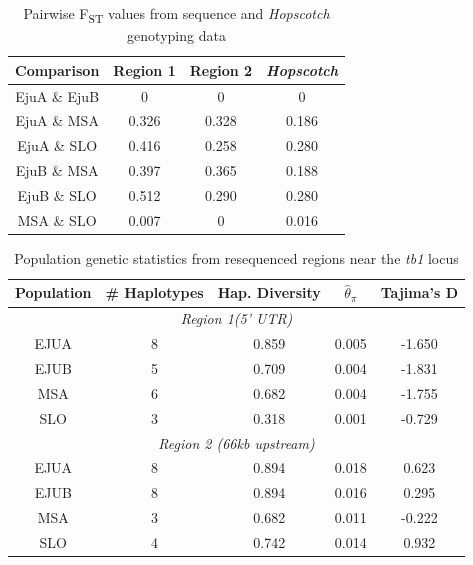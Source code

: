 \documentclass[11pt]{article} %
\begin{document}
\begin{linenumbers}
\begin{flushleft}
\clearpage
\begin{table}[htbp]
  \centering
  \caption{Pairwise F\textsubscript{ST} values from sequence and \emph{Hopscotch} genotyping data}%
    \begin{tabular}{cccc}\\\toprule%
    \textbf{Comparison} & \textbf{Region 1} & \textbf{Region 2} & \textbf{\emph{Hopscotch}} \\\midrule
    EjuA \& EjuB & 0     & 0     & 0 \\
    EjuA \& MSA & 0.326 & 0.328 & 0.186 \\
    EjuA \& SLO & 0.416 & 0.258 & 0.280 \\
    EjuB \& MSA & 0.397 & 0.365 & 0.188 \\
    EjuB \& SLO & 0.512  & 0.290 & 0.280 \\
    MSA \& SLO & 0.007  & 0 & 0.016 \\\bottomrule
    \end{tabular}
  \label{Table1Fst}%
\end{table}

\begin{table}[htbp]
  \centering
  \caption{Population genetic statistics from resequenced regions near the \emph{tb1} locus}
    \begin{tabular}{ccccc}\\\toprule
    \textbf{Population} & \# \textbf{Haplotypes} & \textbf{Hap. Diversity} & \textbf{$\hat\theta_\pi$}    & \textbf{Tajima's D} \\\midrule
    \multicolumn{5}{c}{\textit{Region 1(5' UTR)}} \\
    \multicolumn{1}{c}{EJUA} & 8     & 0.859 & 0.005 & -1.650 \\
    \multicolumn{1}{c}{EJUB} & 5     & 0.709 & 0.004 & -1.831 \\
    \multicolumn{1}{c}{MSA} & 6     & 0.682 & 0.004 & -1.755 \\
    \multicolumn{1}{c}{SLO} & 3     & 0.318 & 0.001 & -0.729 \\
    \multicolumn{5}{c}{\textit{Region 2 (66kb upstream)}} \\
    \multicolumn{1}{c}{EJUA} & 8     & 0.894 & 0.018 & 0.623 \\
    \multicolumn{1}{c}{EJUB} & 8     & 0.894 & 0.016 & 0.295 \\
    \multicolumn{1}{c}{MSA} & 3     & 0.682 & 0.011 & -0.222 \\
    \multicolumn{1}{c}{SLO} & 4     & 0.742 & 0.014 & 0.932 \\\bottomrule
    \end{tabular}
  \label{Table2Diversity}
\end{table}


\end{flushleft}
\end{linenumbers}
\end{document}
